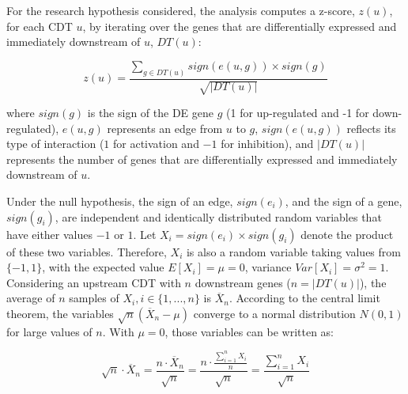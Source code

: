 \newpage

For the research hypothesis considered, the analysis computes a z-score, $z(u)$, for each CDT $u$, by iterating over the genes that are differentially expressed and immediately downstream of $u$, $DT(u)$: 



\begin{equation}
\label{eq:zscore}
z(u)=\frac{\sum\limits_{g \in DT(u)} sign(e(u,g)) \times sign(g)}{\sqrt{|DT(u)|}}
\end{equation}

where $sign(g)$ is the sign of the DE gene $g$ (1 for up-regulated and -1 for down-regulated), $e(u,g)$ represents an edge from $u$ to $g$,  $sign(e(u,g))$ reflects its type of interaction ($1$ for activation and $-1$ for inhibition), and $|DT(u)|$ represents the number of genes that are differentially expressed and immediately downstream of $u$. 


Under the null hypothesis, the sign of an edge, $sign(e_i)$, and the sign of a gene, $sign(g_i)$, are independent and identically distributed random variables that have either values $-1$ or $1$.  Let $X_i = sign(e_i) \times sign(g_i)$ denote the product of these two variables. Therefore, $X_i$ is also a random variable taking values from $\{-1,1\}$, with the expected value $E[X_i] = \mu = 0$, variance $Var[X_i] = \sigma^2 = 1$. Considering an upstream CDT with $n$ downstream genes ($n = |DT(u)|$), the  average of $n$ samples of $X_i, i \in \{1,...,n\}$ is $\overline{X}_n$.  According to the central limit theorem, the variables $\sqrt{n}(\overline{X}_n - \mu)$ converge  to a normal distribution $N(0,1)$ for large values of $n$. With $\mu = 0$, those variables can be written as:

\begin{equation}
\sqrt{n} \cdot \overline{X}_n = \frac{n \cdot \overline{X}_n} {\sqrt{n}} = \frac{n \cdot \frac{\sum_{i=1}^n X_i}{n}}{\sqrt{n}} = \frac{\sum_{i=1}^n X_i}{\sqrt{n}}
\end{equation}

